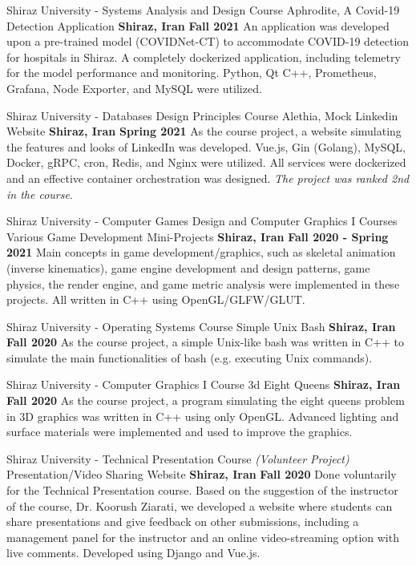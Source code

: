 \begin{cventries}
  \cventry
    {Shiraz University - Systems Analysis and Design Course} %
    {Aphrodite, A Covid-19 Detection Application} %
    {\textbf{Shiraz, Iran}} %
    {\textbf{Fall 2021}} %
    {
      An application was developed upon a pre-trained model (COVIDNet-CT) to accommodate COVID-19 detection for hospitals in Shiraz. A completely dockerized application, including telemetry for the model performance and monitoring. Python, Qt C++, Prometheus, Grafana, Node Exporter, and MySQL were utilized.
    }

  \cventry
    {Shiraz University - Databases Design Principles Course} %
    {Alethia, Mock Linkedin Website} %
    {\textbf{Shiraz, Iran}} %
    {\textbf{Spring 2021}} %
    {
      As the course project, a website simulating the features and looks of LinkedIn was developed. Vue.js, Gin (Golang), MySQL, Docker, gRPC, cron, Redis, and Nginx were utilized. All services were dockerized and an effective container orchestration was designed. \emph{The project was ranked 2nd in the course}.
    }

  \cventry
    {Shiraz University - Computer Games Design and Computer Graphics I Courses} %
    {Various Game Development Mini-Projects} %
    {\textbf{Shiraz, Iran}} %
    {\textbf{Fall 2020 - Spring 2021}} %
    {
      Main concepts in game development/graphics, such as skeletal animation (inverse kinematics), game engine development and design patterns, game physics, the render engine, and game metric analysis were implemented in these projects. All written in C++ using OpenGL/GLFW/GLUT.
    }

  \cventry
    {Shiraz University - Operating Systems Course} %
    {Simple Unix Bash} %
    {\textbf{Shiraz, Iran}} %
    {\textbf{Fall 2020}} %
    {
      As the course project, a simple Unix-like bash was written in C++ to simulate the main functionalities of bash (e.g. executing Unix commands).
    }

  \cventry
    {Shiraz University - Computer Graphics I Course} %
    {3d Eight Queens} %
    {\textbf{Shiraz, Iran}} %
    {\textbf{Fall 2020}} %
    {
      As the course project, a program simulating the eight queens problem in 3D graphics was written in C++ using only OpenGL. Advanced lighting and surface materials were implemented and used to improve the graphics.
    }

  \cventry
    {Shiraz University - Technical Presentation Course \emph{(Volunteer Project)}} %
    {Presentation/Video Sharing Website} %
    {\textbf{Shiraz, Iran}} %
    {\textbf{Fall 2020}} %
    {
      Done voluntarily for the Technical Presentation course. Based on the suggestion of the instructor of the course, Dr. Koorush Ziarati, we developed a website where students can share presentations and give feedback on other submissions, including a management panel for the instructor and an online video-streaming option with live comments. Developed using Django and Vue.js.
    }


\end{cventries}
